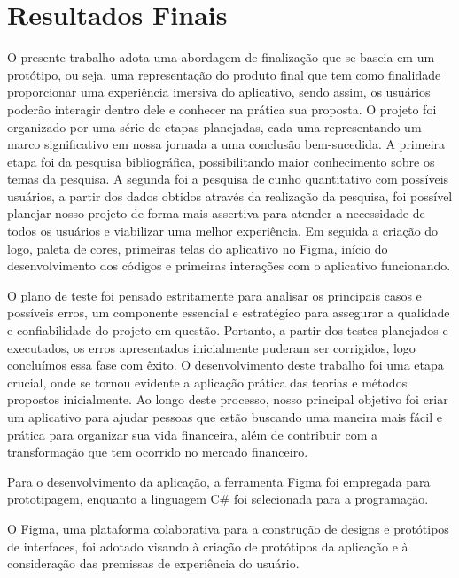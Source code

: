 % 

\chapter[Resultados finais]{Resultados Finais}

O presente trabalho adota uma abordagem de finalização que se baseia em um protótipo, ou seja, uma representação do produto final que tem como finalidade proporcionar uma experiência imersiva do aplicativo, sendo assim, os usuários poderão interagir dentro dele e conhecer na prática sua proposta. O projeto foi organizado por uma série de etapas planejadas, cada uma representando um marco significativo em nossa jornada a uma conclusão bem-sucedida. A primeira etapa foi da pesquisa bibliográfica, possibilitando maior conhecimento sobre os temas da pesquisa. A segunda foi a pesquisa de cunho quantitativo com possíveis usuários, a partir dos dados obtidos através da realização da pesquisa, foi possível planejar nosso projeto de forma mais assertiva para atender a necessidade de todos os usuários e viabilizar uma melhor experiência. Em seguida a criação do logo, paleta de cores, primeiras telas do aplicativo no Figma, início do desenvolvimento dos códigos e primeiras interações com o aplicativo funcionando. 

O plano de teste foi pensado estritamente para analisar os principais casos e possíveis erros, um componente essencial e estratégico para assegurar a qualidade e confiabilidade do projeto em questão. Portanto, a partir dos testes planejados e executados, os erros apresentados inicialmente puderam ser corrigidos, logo concluímos essa fase com êxito.
O desenvolvimento deste trabalho foi uma etapa crucial, onde se tornou evidente a aplicação prática das teorias e métodos propostos inicialmente. Ao longo deste processo, nosso principal objetivo foi criar um aplicativo para ajudar pessoas que estão buscando uma maneira mais fácil e prática para organizar sua vida financeira, além de contribuir com a transformação que tem ocorrido no mercado financeiro. 

Para o desenvolvimento da aplicação, a ferramenta Figma foi empregada para prototipagem, enquanto a linguagem C\# foi selecionada para a programação. 

O Figma, uma plataforma colaborativa para a construção de designs e protótipos de interfaces, foi adotado visando à criação de protótipos da aplicação e à consideração das premissas de experiência do usuário.

